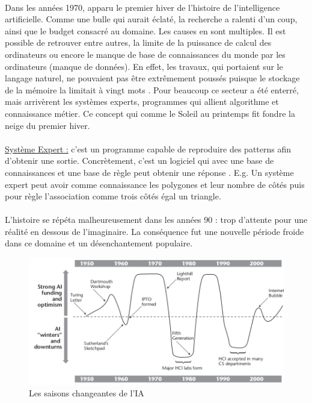 \documentclass[10pt, french, a4paper]{report}
\begin{document}
\paragraph{}
Dans les années 1970, apparu le premier hiver de l’histoire de l’intelligence artificielle. Comme une bulle qui aurait éclaté, la recherche a ralenti d’un coup, ainsi que le budget consacré au domaine. Les causes en sont multiples. Il est possible de retrouver entre autres, la limite de la puissance de calcul des ordinateurs ou encore le manque de base de connaissances du monde par les ordinateurs (manque de données). En effet, les travaux, qui portaient sur le langage naturel, ne pouvaient pas être extrêmement poussés puisque le stockage de la mémoire la limitait à vingt mots \citep{crevier_ai:_1992}. Pour beaucoup ce secteur a été enterré, mais arrivèrent les systèmes experts, programmes qui allient algorithme et connaissance métier. Ce concept qui comme le Soleil au printemps fit fondre la neige du premier hiver.

\paragraph{}
\underline{Système Expert :} c'est un programme capable de reproduire des patterns afin d'obtenir une sortie. Concrètement, c'est un logiciel qui avec une base de connaissances et une base de règle peut obtenir une réponse \citep{jackson_introduction_1998}. E.g. Un système expert peut avoir comme connaissance les polygones et leur nombre de côtés puis pour règle l'association comme trois côtés égal un triangle.

\paragraph{}
L’histoire se répéta malheureusement dans les années 90 : trop d’attente pour une réalité en dessous de l’imaginaire. La conséquence fut une nouvelle période froide dans ce domaine et un désenchantement populaire.

\begin{center}
  \begin{figure}[hbt!]
      \includegraphics[width=\textwidth]{images/grudin_2009_changing_seasons_ai.png}
      \caption{Les saisons changeantes de l'IA \citep{grudin_ai_2009}}
  \end{figure}
\end{center}
\end{document}
